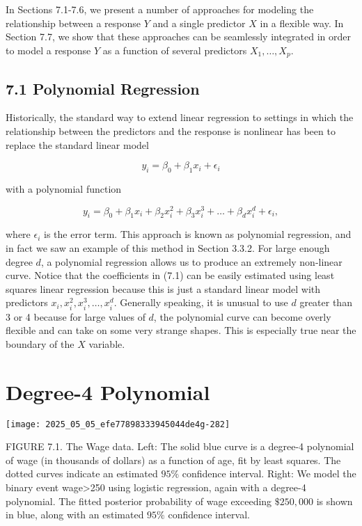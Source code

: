 \documentclass[10pt]{article}
\begin{document}
In Sections 7.1-7.6, we present a number of approaches for modeling the relationship between a response $Y$ and a single predictor $X$ in a flexible way. In Section 7.7, we show that these approaches can be seamlessly integrated in order to model a response $Y$ as a function of several predictors $X_{1}, \ldots, X_{p}$.

\subsection*{7.1 Polynomial Regression}
Historically, the standard way to extend linear regression to settings in which the relationship between the predictors and the response is nonlinear has been to replace the standard linear model

$$
y_{i}=\beta_{0}+\beta_{1} x_{i}+\epsilon_{i}
$$

with a polynomial function


\begin{equation*}
y_{i}=\beta_{0}+\beta_{1} x_{i}+\beta_{2} x_{i}^{2}+\beta_{3} x_{i}^{3}+\ldots+\beta_{d} x_{i}^{d}+\epsilon_{i}, \tag{7.1}
\end{equation*}


where $\epsilon_{i}$ is the error term. This approach is known as polynomial regression, and in fact we saw an example of this method in Section 3.3.2. For large enough degree $d$, a polynomial regression allows us to produce an extremely non-linear curve. Notice that the coefficients in (7.1) can be easily estimated using least squares linear regression because this is just a standard linear model with predictors $x_{i}, x_{i}^{2}, x_{i}^{3}, \ldots, x_{i}^{d}$. Generally speaking, it is unusual to use $d$ greater than 3 or 4 because for large values of $d$, the polynomial curve can become overly flexible and can take on some very strange shapes. This is especially true near the boundary of the $X$ variable.


\section*{Degree-4 Polynomial}
\begin{center}
\texttt{[image: 2025\_05\_05\_efe77898333945044de4g-282]}
\end{center}

FIGURE 7.1. The Wage data. Left: The solid blue curve is a degree-4 polynomial of wage (in thousands of dollars) as a function of age, fit by least squares. The dotted curves indicate an estimated $95 \%$ confidence interval. Right: We model the binary event wage>250 using logistic regression, again with a degree-4 polynomial. The fitted posterior probability of wage exceeding $\$ 250,000$ is shown in blue, along with an estimated $95 \%$ confidence interval.
\end{document}
